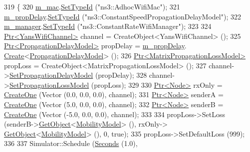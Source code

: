 \begin{DoxyCode}
319 \{
320   \hyperlink{classInterferenceHelperSequenceTest_ac01570a00a54e92493699f76e7dc29db}{m\_mac}.\hyperlink{classns3_1_1ObjectFactory_a77dcd099064038a1eb7a6b8251229ec3}{SetTypeId} (\textcolor{stringliteral}{"ns3::AdhocWifiMac"});
321   \hyperlink{classInterferenceHelperSequenceTest_a8bb837ee5101585da2bf13247f18972e}{m\_propDelay}.\hyperlink{classns3_1_1ObjectFactory_a77dcd099064038a1eb7a6b8251229ec3}{SetTypeId} (\textcolor{stringliteral}{"ns3::ConstantSpeedPropagationDelayModel"});
322   \hyperlink{classInterferenceHelperSequenceTest_a8b2a30399b0e12456e64bbb378ef5c5c}{m\_manager}.\hyperlink{classns3_1_1ObjectFactory_a77dcd099064038a1eb7a6b8251229ec3}{SetTypeId} (\textcolor{stringliteral}{"ns3::ConstantRateWifiManager"});
323 
324   \hyperlink{classns3_1_1Ptr}{Ptr<YansWifiChannel>} channel = CreateObject<YansWifiChannel> ();
325   \hyperlink{classns3_1_1Ptr}{Ptr<PropagationDelayModel>} propDelay = \hyperlink{classInterferenceHelperSequenceTest_a8bb837ee5101585da2bf13247f18972e}{m\_propDelay}.
      \hyperlink{classns3_1_1ObjectFactory_a18152e93f0a6fe184ed7300cb31e9896}{Create}<\hyperlink{classns3_1_1PropagationDelayModel}{PropagationDelayModel}> ();
326   \hyperlink{classns3_1_1Ptr}{Ptr<MatrixPropagationLossModel>} propLoss = 
      CreateObject<MatrixPropagationLossModel> ();
327   channel->\hyperlink{classns3_1_1YansWifiChannel_a51ebdd5a1d897dc46cf9783ac2879b98}{SetPropagationDelayModel} (propDelay);
328   channel->\hyperlink{classns3_1_1YansWifiChannel_ad2f92be1fb34be0075141cbb4f779191}{SetPropagationLossModel} (propLoss);
329 
330   \hyperlink{classns3_1_1Ptr}{Ptr<Node>} rxOnly = \hyperlink{classInterferenceHelperSequenceTest_aaf6b2c6dc1b1c6abf0743b018e78544a}{CreateOne} (Vector (0.0, 0.0, 0.0), channel);
331   \hyperlink{classns3_1_1Ptr}{Ptr<Node>} senderA = \hyperlink{classInterferenceHelperSequenceTest_aaf6b2c6dc1b1c6abf0743b018e78544a}{CreateOne} (Vector (5.0, 0.0, 0.0), channel);
332   \hyperlink{classns3_1_1Ptr}{Ptr<Node>} senderB = \hyperlink{classInterferenceHelperSequenceTest_aaf6b2c6dc1b1c6abf0743b018e78544a}{CreateOne} (Vector (-5.0, 0.0, 0.0), channel);
333 
334   propLoss->SetLoss (senderB->\hyperlink{classns3_1_1Object_a13e18c00017096c8381eb651d5bd0783}{GetObject}<\hyperlink{classns3_1_1MobilityModel}{MobilityModel}> (), rxOnly->
      \hyperlink{classns3_1_1Object_a13e18c00017096c8381eb651d5bd0783}{GetObject}<\hyperlink{classns3_1_1MobilityModel}{MobilityModel}> (), 0, \textcolor{keyword}{true});
335   propLoss->SetDefaultLoss (999);
336 
337   Simulator::Schedule (\hyperlink{group__timecivil_ga33c34b816f8ff6628e33d5c8e9713b9e}{Seconds} (1.0),

\end{DoxyCode}
